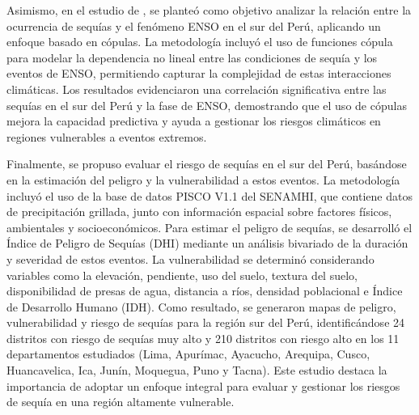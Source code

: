 Asimismo, en el estudio de \textcite{Cabrera2019}, se planteó como objetivo analizar la relación entre la ocurrencia de sequías y el fenómeno ENSO en el sur del Perú, aplicando un enfoque basado en cópulas. La metodología incluyó el uso de funciones cópula para modelar la dependencia no lineal entre las condiciones de sequía y los eventos de ENSO, permitiendo capturar la complejidad de estas interacciones climáticas. Los resultados evidenciaron una correlación significativa entre las sequías en el sur del Perú y la fase de ENSO, demostrando que el uso de cópulas mejora la capacidad predictiva y ayuda a gestionar los riesgos climáticos en regiones vulnerables a eventos extremos.

Finalmente, \textcite{Vega2016} se propuso evaluar el riesgo de sequías en el sur del Perú, basándose en la estimación del peligro y la vulnerabilidad a estos eventos. La metodología incluyó el uso de la base de datos PISCO V1.1 del SENAMHI, que contiene datos de precipitación grillada, junto con información espacial sobre factores físicos, ambientales y socioeconómicos. Para estimar el peligro de sequías, se desarrolló el Índice de Peligro de Sequías (DHI) mediante un análisis bivariado de la duración y severidad de estos eventos. La vulnerabilidad se determinó considerando variables como la elevación, pendiente, uso del suelo, textura del suelo, disponibilidad de presas de agua, distancia a ríos, densidad poblacional e Índice de Desarrollo Humano (IDH). Como resultado, se generaron mapas de peligro, vulnerabilidad y riesgo de sequías para la región sur del Perú, identificándose 24 distritos con riesgo de sequías muy alto y 210 distritos con riesgo alto en los 11 departamentos estudiados (Lima, Apurímac, Ayacucho, Arequipa, Cusco, Huancavelica, Ica, Junín, Moquegua, Puno y Tacna). Este estudio destaca la importancia de adoptar un enfoque integral para evaluar y gestionar los riesgos de sequía en una región altamente vulnerable.

